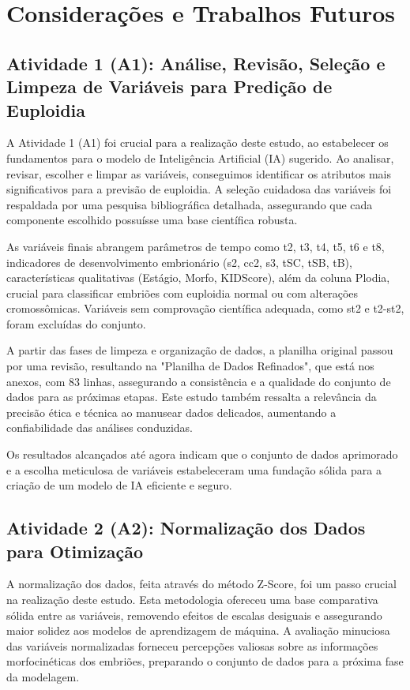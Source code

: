 \chapter[Considerações e Trabalhos Futuros]{Considerações e Trabalhos Futuros}

\section{Atividade 1 (A1): Análise, Revisão, Seleção e Limpeza de Variáveis para Predição de Euploidia}
 
A Atividade 1 (A1) foi crucial para a realização deste estudo, ao estabelecer os fundamentos para o modelo de Inteligência Artificial (IA) sugerido. Ao analisar, revisar, escolher e limpar as variáveis, conseguimos identificar os atributos mais significativos para a previsão de euploidia. A seleção cuidadosa das variáveis foi respaldada por uma pesquisa bibliográfica detalhada, assegurando que cada componente escolhido possuísse uma base científica robusta.

As variáveis finais abrangem parâmetros de tempo como t2, t3, t4, t5, t6 e t8, indicadores de desenvolvimento embrionário (s2, cc2, s3, tSC, tSB, tB), características qualitativas (Estágio, Morfo, KIDScore), além da coluna Plodia, crucial para classificar embriões com euploidia normal ou com alterações cromossômicas. Variáveis sem comprovação científica adequada, como st2 e t2-st2, foram excluídas do conjunto.

A partir das fases de limpeza e organização de dados, a planilha original passou por uma revisão, resultando na "Planilha de Dados Refinados", que está nos anexos, com 83 linhas, assegurando a consistência e a qualidade do conjunto de dados para as próximas etapas. Este estudo também ressalta a relevância da precisão ética e técnica ao manusear dados delicados, aumentando a confiabilidade das análises conduzidas.

Os resultados alcançados até agora indicam que o conjunto de dados aprimorado e a escolha meticulosa de variáveis estabeleceram uma fundação sólida para a criação de um modelo de IA eficiente e seguro.

\section{Atividade 2 (A2): Normalização dos Dados para Otimização}

A normalização dos dados, feita através do método Z-Score, foi um passo crucial na realização deste estudo. Esta metodologia ofereceu uma base comparativa sólida entre as variáveis, removendo efeitos de escalas desiguais e assegurando maior solidez aos modelos de aprendizagem de máquina. A avaliação minuciosa das variáveis normalizadas forneceu percepções valiosas sobre as informações morfocinéticas dos embriões, preparando o conjunto de dados para a próxima fase da modelagem.

